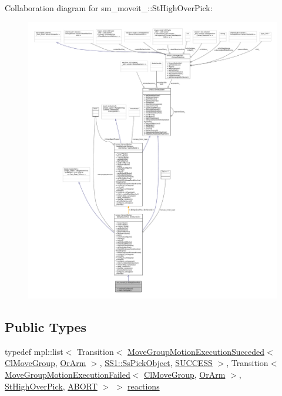 Collaboration diagram for sm\+\_\+moveit\+\_\+:\+:St\+High\+Over\+Pick\+:
\nopagebreak
\begin{figure}[H]
\begin{center}
\leavevmode
\includegraphics[width=350pt]{structsm__moveit__3_1_1StHighOverPick__coll__graph}
\end{center}
\end{figure}
\subsection*{Public Types}
\begin{DoxyCompactItemize}
\item 
typedef mpl\+::list$<$ Transition$<$ \hyperlink{structmove__group__interface__client_1_1MoveGroupMotionExecutionSucceded}{Move\+Group\+Motion\+Execution\+Succeded}$<$ \hyperlink{classmove__group__interface__client_1_1ClMoveGroup}{Cl\+Move\+Group}, \hyperlink{classsm__moveit__3_1_1OrArm}{Or\+Arm} $>$, \hyperlink{structsm__moveit__3_1_1SS1_1_1SsPickObject}{S\+S1\+::\+Ss\+Pick\+Object}, \hyperlink{classSUCCESS}{S\+U\+C\+C\+E\+SS} $>$, Transition$<$ \hyperlink{structmove__group__interface__client_1_1MoveGroupMotionExecutionFailed}{Move\+Group\+Motion\+Execution\+Failed}$<$ \hyperlink{classmove__group__interface__client_1_1ClMoveGroup}{Cl\+Move\+Group}, \hyperlink{classsm__moveit__3_1_1OrArm}{Or\+Arm} $>$, \hyperlink{structsm__moveit__3_1_1StHighOverPick}{St\+High\+Over\+Pick}, \hyperlink{classABORT}{A\+B\+O\+RT} $>$ $>$ \hyperlink{structsm__moveit__3_1_1StHighOverPick_a040b8ba065c27d3103b57f449a3b637f}{reactions}
\end{DoxyCompactItemize}
